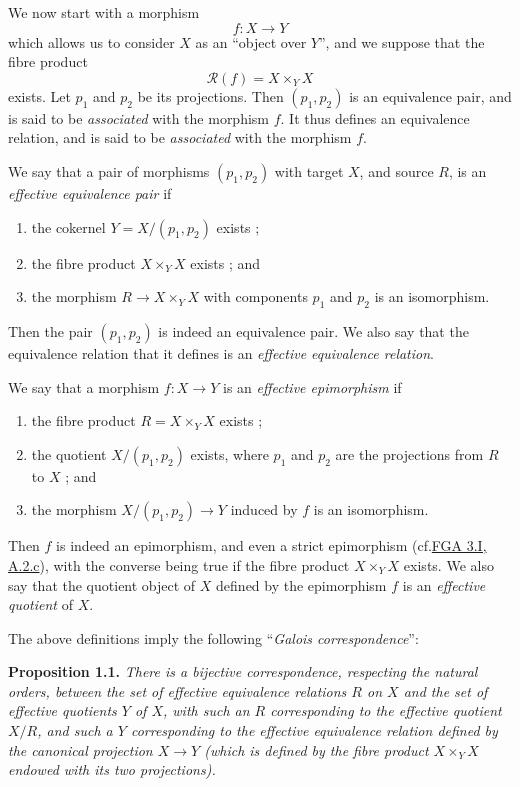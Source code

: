 \documentclass{article}
\providecommand{\tightlist}{%
  \setlength{\itemsep}{0pt}\setlength{\parskip}{0pt}}
\newenvironment{itenv}[1]
  {\phantomsection\par\smallskip\noindent\textbf{#1.}\itshape}
  {\par\smallskip}
\newcommand{\oldpage}[1]{\marginpar{\footnotesize$\Big\vert$ \textit{p.~#1}}}
\theoremstyle{definition}
\theoremstyle{definition}
\theoremstyle{definition}
\theoremstyle{definition}
\theoremstyle{remark}
\begin{document}
We now start with a morphism
\[
  f\colon X\to Y
\]
which allows us to consider \(X\) as an ``object over \(Y\)'', and we suppose that the fibre product
\[
  {\mathcal{R}}(f) = X\times_Y X
\]
exists.
Let \(p_1\) and \(p_2\) be its projections.
Then \((p_1,p_2)\) is an equivalence pair, and is said to be \emph{associated} with the morphism \(f\).
It thus defines an equivalence relation, and is said to be \emph{associated} with the morphism \(f\).

We say that a pair of morphisms \((p_1,p_2)\) with target \(X\), and source \(R\), is an \emph{effective equivalence pair} if

\begin{enumerate}
\def\labelenumi{\roman{enumi}.}
\tightlist
\item
  the cokernel \(Y=X/(p_1,p_2)\) exists ;
\item
  the fibre product \(X\times_Y X\) exists ; and
\item
  the morphism \(R\to X\times_Y X\) with components \(p_1\) and \(p_2\) is an isomorphism.
\end{enumerate}

Then the pair \((p_1,p_2)\) is indeed an equivalence pair.
We also say that the equivalence relation that it defines is an \emph{effective equivalence relation}.

We say that a morphism \(f\colon X\to Y\) is an \emph{effective epimorphism} if

\begin{enumerate}
\def\labelenumi{\roman{enumi}.}
\tightlist
\item
  the fibre product \(R=X\times_Y X\) exists ;
\item
  the quotient \(X/(p_1,p_2)\) exists, where \(p_1\) and \(p_2\) are the projections from \(R\) to \(X\) ; and
\item
  the morphism \(X/(p_1,p_2)\to Y\) induced by \(f\) is an isomorphism.
\end{enumerate}

Then \(f\) is indeed an epimorphism, and even a strict epimorphism (cf.\protect\hyperlink{fga-3-i-section-A.2.c}{FGA 3.I, A.2.c}), with the converse being true if the fibre product \(X\times_Y X\) exists.
We also say that the quotient object of \(X\) defined by the epimorphism \(f\) is an \emph{effective quotient} of \(X\).

The above definitions imply the following ``\emph{Galois correspondence}'':

\leavevmode{}%
\begin{itenv}{Proposition 1.1}
\oldpage{212-04}There is a bijective correspondence, respecting the natural orders, between the set of effective equivalence relations \(R\) on \(X\) and the set of effective quotients \(Y\) of \(X\), with such an \(R\) corresponding to the effective quotient \(X/R\), and such a \(Y\) corresponding to the effective equivalence relation defined by the canonical projection \(X\to Y\) (which is defined by the fibre product \(X\times_Y X\) endowed with its two projections).

\end{itenv}
\end{document}
